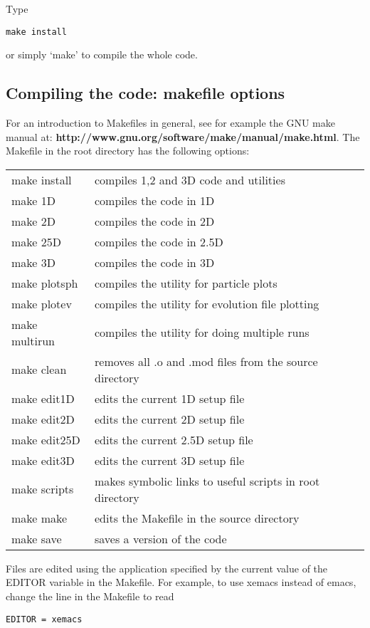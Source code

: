 \documentclass[a4paper,12pt]{article}
\begin{document}
\noindent Type
\begin{verbatim}
make install
\end{verbatim}
or simply `make' to compile the whole
code. 

\subsection{Compiling the code: makefile options}
For an introduction to Makefiles in general, see for example the GNU make manual
at: \textbf{http://www.gnu.org/software/make/manual/make.html}. The Makefile in
the root directory has
the following options:
\begin{table}[!h]
\begin{tabular}{ll}
\hline
make install & compiles 1,2 and 3D code and utilities \\
make 1D & compiles the code in 1D \\
make 2D & compiles the code in 2D \\
make 25D & compiles the code in 2.5D \\
make 3D & compiles the code in 3D \\
make plotsph & compiles the utility for particle plots \\
make plotev & compiles the utility for evolution file plotting \\
make multirun & compiles the utility for doing multiple runs \\
make clean & removes all .o and .mod files from the source directory \\
make edit1D & edits the current 1D setup file \\
make edit2D & edits the current 2D setup file \\
make edit25D & edits the current 2.5D setup file \\
make edit3D & edits the current 3D setup file \\
make scripts & makes symbolic links to useful scripts in root directory \\
make make &  edits the Makefile in the source directory \\
make save & saves a version of the code \\
\hline
\end{tabular}
\end{table}

Files are edited using the application specified by the current value of the
EDITOR variable in the Makefile. For example, to use xemacs instead of emacs, change the line in
the Makefile to read
\begin{verbatim}
EDITOR = xemacs
\end{verbatim}
\end{document}
